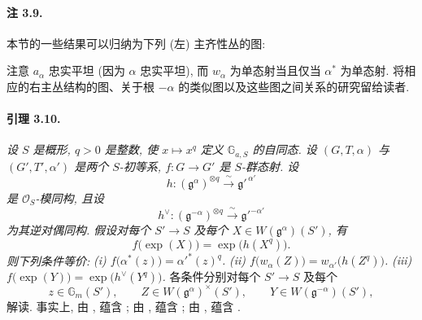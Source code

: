 \paragraph{\textbf{注 3.9.}}
本节的一些结果可以归纳为下列 (左) 主齐性丛的图:
\begin{center}
  \begin{minipage}{\textwidth}
  \centering
  \smallskip
  \end{minipage}
\end{center}

注意 \(a_\alpha\) 忠实平坦 (因为 \(\alpha\) 忠实平坦), 而 \(w_\alpha\) 为单态射当且仅当 \(\alpha^\ast\) 为单态射. 将相应的右主丛结构的图、关于根 \(-\alpha\) 的类似图以及这些图之间关系的研究留给读者.

\paragraph{\textbf{引理 3.10.}}
\emph{设 \(S\) 是概形, \(q>0\) 是整数, 使 \(x\mapsto x^q\) 定义 \(\mathbb G_{a,S}\) 的自同态. 设 \((G,T,\alpha)\) 与 \((G',T',\alpha')\) 是两个 \(S\)-初等系, \(f\colon G\to G'\) 是 \(S\)-群态射. 设}
\[
  h\colon(\mathfrak g^\alpha)^{\otimes q}
    \xrightarrow{\ \sim\ }\mathfrak g'^{\,\alpha'}
\]
\emph{是 \(\mathcal O_S\)-模同构, 且设}
\[
  h^\vee\colon(\mathfrak g^{-\alpha})^{\otimes q}
    \xrightarrow{\ \sim\ }\mathfrak g'^{-\alpha'}
\]
\emph{为其逆对偶同构. 假设对每个 \(S'\to S\) 及每个 \(X\in W(\mathfrak g^\alpha)(S')\), 有}
\[
  f\bigl(\exp(X)\bigr)=\exp\bigl(h(X^q)\bigr).
\]
\emph{则下列条件等价:}
\smallskip
\noindent\emph{\textup{(i)} \(f\bigl(\alpha^\ast(z)\bigr)=\alpha'^\ast(z)^q\).}
\smallskip
\noindent\emph{\textup{(ii)} \(f\bigl(w_\alpha(Z)\bigr)=w_{\alpha'}\bigl(h(Z^q)\bigr)\).}
\smallskip
\noindent\emph{\textup{(iii)} \(f\bigl(\exp(Y)\bigr)=\exp\bigl(h^\vee(Y^q)\bigr)\).}
\smallskip
各条件分别对每个 \(S'\to S\) 及每个
\[
  z\in\mathbb G_m(S'),\qquad
  Z\in W(\mathfrak g^\alpha)^\times(S'),\qquad
  Y\in W(\mathfrak g^{-\alpha})(S'),
\]
解读. 事实上, 由 , \textup{} 蕴含 \textup{}; 由 , \textup{} 蕴含 \textup{}; 由 , \textup{} 蕴含 \textup{}.

